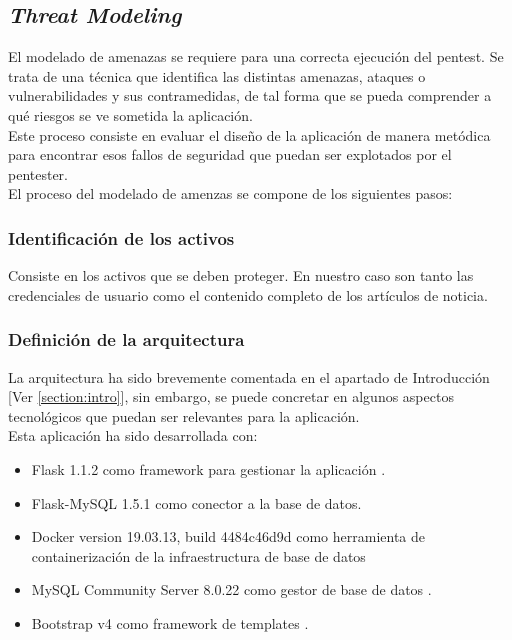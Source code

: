 \documentclass[a4paper,oneside]{article}
\begin{document}
\newpage

\subsection{\textit{Threat Modeling}}

El modelado de amenazas se requiere para una correcta ejecución del pentest. Se trata de una técnica que identifica las distintas amenazas, ataques o vulnerabilidades y sus contramedidas, de tal forma que se pueda comprender a qué riesgos se ve sometida la aplicación.\\

Este proceso consiste en evaluar el diseño de la aplicación de manera metódica para encontrar esos fallos de seguridad que puedan ser explotados por el pentester.\\

El proceso del modelado de amenzas se compone de los siguientes pasos:
\subsubsection{Identificación de los activos}
Consiste en los activos que se deben proteger. En nuestro caso son tanto las credenciales de usuario como el contenido completo de los artículos de noticia.

\subsubsection{Definición de la arquitectura}
La arquitectura ha sido brevemente comentada en el apartado de Introducción [Ver \ref{section:intro}], sin embargo, se puede concretar en algunos aspectos tecnológicos que puedan ser relevantes para la aplicación.\\

Esta aplicación ha sido desarrollada con:

\begin{itemize}
\item Flask 1.1.2 como framework para gestionar la aplicación \cite{flask}.
\item Flask-MySQL 1.5.1 como conector a la base de datos.
\item Docker version 19.03.13, build 4484c46d9d como herramienta de containerización de la infraestructura de base de datos 
\item MySQL Community Server 8.0.22 como gestor de base de datos \cite{mysql}.
\item Bootstrap v4 como framework de templates \cite{bootstrap}.
\end{itemize}
\end{document}
